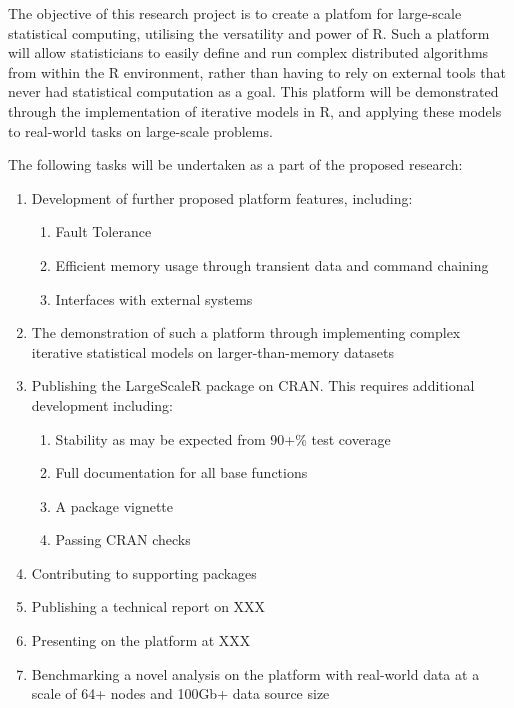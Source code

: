 The objective of this research project is to create a platfom for large-scale statistical computing, utilising the versatility and power of R.
Such a platform will allow statisticians to easily define and run complex distributed algorithms from within the R environment, rather than having to rely on external tools that never had statistical computation as a goal.
This platform will be demonstrated through the implementation of iterative models in R, and applying these models to real-world tasks on large-scale problems.

The following tasks will be undertaken as a part of the proposed research:

\begin{enumerate}
        \item Development of further proposed platform features, including:
                \begin{enumerate}
                        \item Fault Tolerance
                        \item Efficient memory usage through transient data and command chaining
                        \item Interfaces with external systems
                \end{enumerate}
        \item The demonstration of such a platform through implementing complex iterative statistical models on larger-than-memory datasets
        \item Publishing the LargeScaleR package on CRAN. This requires additional development including:
                \begin{enumerate}
                        \item Stability as may be expected from 90+\% test coverage
                        \item Full documentation for all base functions
                        \item A package vignette
                        \item Passing CRAN checks
                \end{enumerate}
        \item Contributing to supporting packages
        \item Publishing a technical report on XXX
        \item Presenting on the platform at XXX
        \item Benchmarking a novel analysis on the platform with real-world data at a scale of 64+ nodes and 100Gb+ data source size
\end{enumerate}
